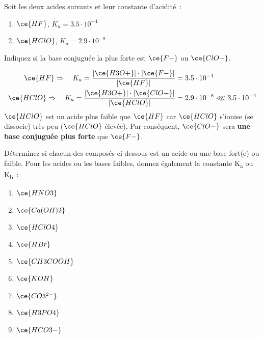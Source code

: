 \documentclass[
  11pt,
  a4paper,
  openany]{book}
\providecommand{\tightlist}{%
  \setlength{\itemsep}{0pt}\setlength{\parskip}{0pt}}
\begin{document}
\begin{Exercise}
Soit les deux acides suivants et leur constante d'acidité~:

\begin{enumerate}
\def\labelenumi{\alph{enumi}.}
\tightlist
\item
  \(\ce{HF}\), \(K_a = 3.5 \cdot 10^{-4}\)
\item
  \(\ce{HClO}\), \(K_a = 2.9 \cdot 10^{-8}\)
\end{enumerate}

Indiquez si la base conjuguée la plus forte est \(\ce{F-}\) ou \(\ce{ClO-}\).

\end{Exercise}

\begin{Answer}
\[
\begin{split}
  \ce{HF} \Rightarrow \quad K_a = \frac{|\ce{H3O+}| \cdot |\ce{F-}|}{|\ce{HF}|} &= 3.5 \cdot 10^{-4} \\
  \ce{HClO} \Rightarrow \quad K_a = \frac{|\ce{H3O+}| \cdot |\ce{ClO-}|}{|\ce{HClO}|} &= 2.9 \cdot 10^{-8} \lll 3.5 \cdot 10^{-4}
\end{split}
\]
\(\ce{HClO}\) est un acide plus faible que \(\ce{HF}\) car \(\ce{HClO}\) s'ionise (se dissocie) très peu (\textbar{}\(\ce{HClO}\)\textbar{} élevée). Par conséquent, \(\ce{ClO-}\) sera \textbf{une base conjuguée plus forte} que \(\ce{F-}\).

\end{Answer}

\clearpage

\begin{Exercise}

Déterminez si chacun des composés ci-dessous est un acide ou une base fort(e) ou faible. Pour les acides ou les bases faibles, donnez également la constante K\textsubscript{a} ou K\textsubscript{b}~:

\begin{enumerate}
\def\labelenumi{\alph{enumi}.}
\tightlist
\item
  \(\ce{HNO3}\)
\item
  \(\ce{Ca(OH)2}\)
\item
  \(\ce{HClO4}\)
\item
  \(\ce{HBr}\)
\item
  \(\ce{CH3COOH}\)
\item
  \(\ce{KOH}\)
\item
  \(\ce{CO3^{2-}}\)
\item
  \(\ce{H3PO4}\)
\item
  \(\ce{HCO3-}\)
\end{enumerate}

\end{Exercise}
\end{document}
